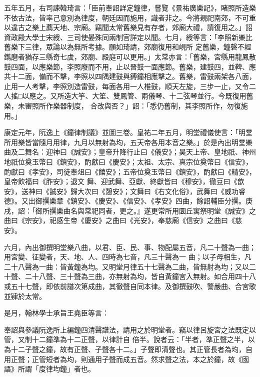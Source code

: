 \begin{pinyinscope}
 五年五月，右司諫韓琦言：「臣前奉詔詳定鐘律，嘗覽《景祐廣樂記》，睹照所造樂不依古法，皆率己意別為律度，朝廷因而施用，識者非之。今將親祀南郊，不可重以違古之樂上薦天地、宗廟。竊聞太常舊樂見有存者，郊廟大禮，請復用之。」詔資政殿大學士宋綬、三司使晏殊同兩制官詳定以聞。七月，綬等言：「李照新樂比舊樂下三律，眾論以為無所考據。願如琦請，郊廟復用和峴所
 定舊樂，鐘磬不經鐫磨者猶存三縣奇七虡，郊廟、殿庭可以更用。」太常亦言：「舊樂，宮縣用龍鳳散鼓四面，以應樂節，李照廢而不用，止以晉鼓一面應節。舊樂，建鼓四，並鞞、應共十二面，備而不擊，李照以四隅建鼓與鎛鐘相應擊之。舊樂，雷鼓兩架各八面，止用一人考擊，李照別造雷鼓，每面各用一人椎鼓，順天左旋，三步一止，又令二人搖□以應之。又所造大竽、大笙、雙鳳管、兩儀琴、十二弦琴並行。今既復用舊樂，未審照所作樂器制度，
 合改與否？」詔：「悉仍舊制，其李照所作，勿復施用。」



 康定元年，阮逸上《鐘律制議》並圖三卷。皇祐二年五月，明堂禮儀使言：「明堂所用樂皆當隨月用律，九月以無射為均，五天帝各用本音之樂。」於是內出明堂樂曲及二舞名：迎神曰《誠安》；皇帝升降行止曰《儀安》；昊天上帝、皇地祇、神州地祇位奠玉幣曰《鎮安》，酌獻曰《慶安》；太祖、太宗、真宗位奠幣曰《信安》，酌獻曰《孝安》，司徒奉俎曰《饎安》；五帝位奠玉幣曰《鎮安》，酌獻曰《精安》，皇帝飲福曰《胙安》；退文
 舞、迎武舞、亞獻、終獻皆曰《穆安》，徹豆曰《歆安》，送神曰《誠安》歸大次曰《憩安》；文舞曰《右文化俗》，武舞曰《威功睿德》。又出御撰樂章《鎮安》、《慶安》、《信安》、《孝安》四曲，餘詔輔臣分撰。庚戌，詔：「御所撰樂曲名與常祀同者，更之。』遂更常所用圜丘寓祭明堂《誠安》之曲曰《宗安》，祀感生帝《慶安》之曲曰《光安》，奉慈廟《信安》之曲曰《慈安》。



 六月，內出御撰明堂樂八曲，以君、臣、民、事、物配屬五音，凡二十聲為一曲；用宮變、征變者，天、地、人、四時為七音，凡三十聲為一
 曲；以子母相生，凡二十八聲為一曲：皆黃鐘為均。又明堂月律五十七聲為二曲，皆無射為均；又以二十聲、二十八聲、三十聲為三曲，亦無射為均，皆自黃鐘宮入無射。如合用四十八或五十七聲，即依前譜次第成曲，其徹聲自同本律。及御撰鼓吹、警嚴曲、合宮歌並肄於太常。



 是月，翰林學士承旨王堯臣等言：



 奉詔與參議阮逸所上編鐘四清聲譜法，請用之於明堂者。竊以律呂旋宮之法既定以管，又制十二鐘準為十二正聲，以律計自
 倍半。說者云：「半者，準正聲之半，以為十二子聲之鐘，故有正聲、子聲各十二。」子聲即清聲也。其正管長者為均，自用正聲；正管短者為均，則通用子聲而成五音。然求聲之法，本之於鐘，故《國語》所謂「度律均鐘」者也。




\end{pinyinscope}
